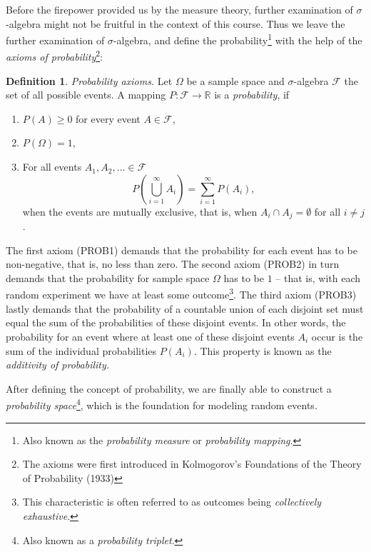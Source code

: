 \documentclass[12pt,a4paper,leqno]{report}
\newcommand{\R}{\mathbb{R}}
\newcommand{\F}{\mathcal{F}}
\theoremstyle{plain}
\theoremstyle{definition}
\newtheorem{maar}[equation]{Definition}
\begin{document}
\bigskip

Before the firepower provided us by the measure theory, further examination of $\sigma$-algebra might not be fruitful in the context of this course. Thus we leave the further examination of $\sigma$-algebra, and define the probability\footnote{Also known as the \emph{probability measure} or \emph{probability mapping}.} with the help of the \emph{axioms of probability}\footnote{The axioms were first introduced in Kolmogorov's Foundations of the Theory of Probability (1933)}:

\begin{maar}
\label{maar:prob}
\emph{Probability axioms.} Let $\Omega$ be a sample space and $\sigma$-algebra $\F$ the set of all possible events. A mapping $P:\mathcal{F} \rightarrow \R$ is a \emph{probability}, if
\begin{enumerate}[(PROB1)]
\item $P(A) \geq 0$ for every event $A \in \F$,
\item $P(\Omega) = 1$,
\item For all events $A_1, A_2, \ldots \in \F$  
\[
P\left(\bigcup_{i=1}^\infty A_i\right) = \sum_{i=1}^\infty P(A_i), 
\]
when the events are mutually exclusive, that is, when $A_i \cap A_j = \emptyset$ for all $i \neq j$. 
\end{enumerate} 

\bigskip
The first axiom (PROB1) demands that the probability for each event has to be non-negative, that is, no less than zero. The second axiom (PROB2) in turn demands that the probability for sample space $\Omega$ has to be $1$ -- that is, with each random experiment we have at least some outcome\footnote{This characteristic is often referred to as outcomes being  \emph{collectively exhaustive}.}. The third axiom (PROB3) lastly demands that the probability of a countable union of each disjoint set must equal the sum of the probabilities of these disjoint events. In other words, the probability for an event where at least one of these disjoint events $A_i$ occur is the sum of the individual probabilities $P(A_i)$. This property is known as the \emph{additivity of probability.} 
\end{maar}

After defining the concept of probability, we are finally able to construct a \emph{probability space}\footnote{Also known as a \emph{probability triplet}.}, which is the foundation for modeling random events.
\end{document}
